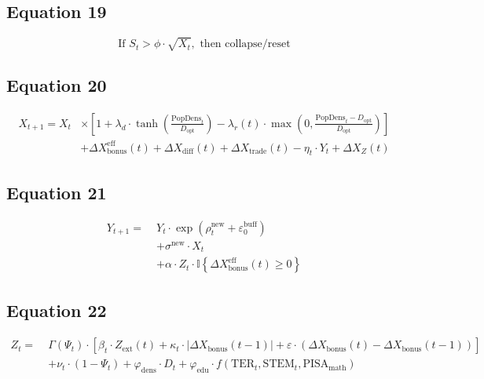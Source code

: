 \documentclass[12pt]{article}
\begin{document}
\subsection*{Equation 19}
\begin{equation}
\text{If } S_t > \phi \cdot \sqrt{X_t}, \text{ then collapse/reset}
\end{equation}

\subsection*{Equation 20}
\begin{align}
X_{t+1} = X_t &\times \left[ 1 + \lambda_d \cdot \tanh\left(\frac{\text{PopDens}_t}{D_{\text{opt}}}\right) - \lambda_r(t) \cdot \max\left(0, \frac{\text{PopDens}_t - D_{\text{opt}}}{D_{\text{opt}}} \right) \right] \\
&+ \Delta X_{\text{bonus}}^{\text{eff}}(t) + \Delta X_{\text{diff}}(t) + \Delta X_{\text{trade}}(t) - \eta_t \cdot Y_t + \Delta X_Z(t)
\end{align}

\subsection*{Equation 21}
\begin{align}
Y_{t+1} =\; & Y_t \cdot \exp\left( \rho_t^{\text{new}} + \varepsilon_0^{\text{buff}} \right) \\
& + \sigma^{\text{new}} \cdot X_t \\
& + \alpha \cdot Z_t \cdot \mathbb{I} \left\{ \Delta X_{\text{bonus}}^{\text{eff}}(t) \geq 0 \right\}
\end{align}

\subsection*{Equation 22}
\begin{align}
Z_t =\; & \Gamma(\Psi_t) \cdot \left[ \beta_t \cdot Z_{\text{ext}}(t) + \kappa_t \cdot \left| \Delta X_{\text{bonus}}(t-1) \right| + \varepsilon \cdot \left( \Delta X_{\text{bonus}}(t) - \Delta X_{\text{bonus}}(t-1) \right) \right] \\
& + \nu_t \cdot (1 - \Psi_t) + \varphi_{\text{dens}} \cdot D_t + \varphi_{\text{edu}} \cdot f(\text{TER}_t, \text{STEM}_t, \text{PISA}_{\text{math}})
\end{align}
\end{document}
